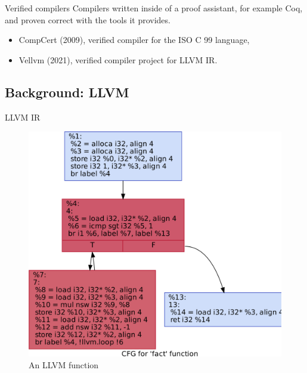 \documentclass{beamer}
\begin{document}
\begin{frame}{Verified compilers}
  Compilers written inside of a proof assistant, for example Coq, and proven correct with the tools it provides.
  \begin{itemize}
    \item CompCert (2009), verified compiler for the ISO C 99 language,
    \item Vellvm (2021), verified compiler project for LLVM IR.
  \end{itemize}
\end{frame}

\subsection*{Background: LLVM}

\begin{frame}{LLVM IR}
  \begin{figure}
  \end{figure}
\end{frame}

\begin{frame}{}
  \begin{figure}
    \includegraphics[height=.8\textheight]{images/output2.pdf}
    \caption{An LLVM function}
  \end{figure}
\end{frame}
\end{document}
